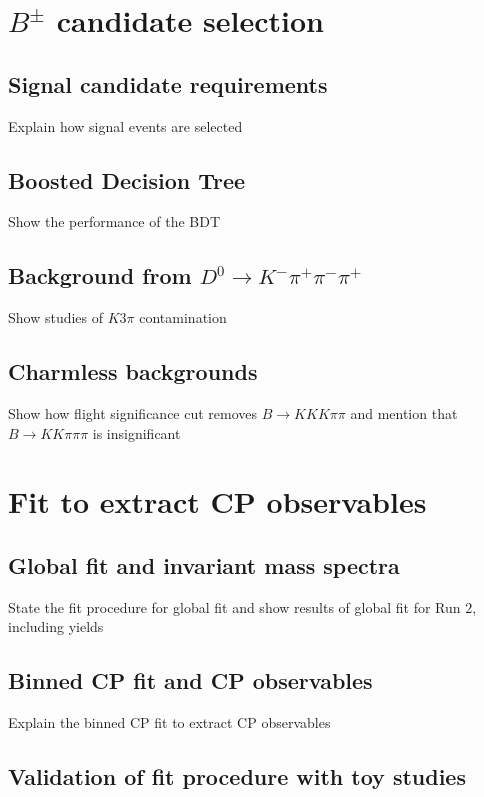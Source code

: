 \documentclass[12pt, a4paper, notitlepage, onecolumn]{article}
\numberwithin{equation}{section}
\begin{document}
\section{\texorpdfstring{$B^\pm$}{B} candidate selection}
\subsection{Signal candidate requirements}
\noindent Explain how signal events are selected



\subsection{Boosted Decision Tree}
\noindent Show the performance of the BDT

\subsection{Background from \texorpdfstring{$D^0\to K^-\pi^+\pi^-\pi^+$}{D->Kpipipi}}
\noindent Show studies of $K3\pi$ contamination

\subsection{Charmless backgrounds}
\noindent Show how flight significance cut removes $B\to KKK\pi\pi$ and mention that $B\to KK\pi\pi\pi$ is insignificant

\section{Fit to extract CP observables}
\subsection{Global fit and invariant mass spectra}
\noindent State the fit procedure for global fit and show results of global fit for Run $2$, including yields

\subsection{Binned CP fit and CP observables}
\noindent Explain the binned CP fit to extract CP observables

\subsection{Validation of fit procedure with toy studies}
\end{document}
